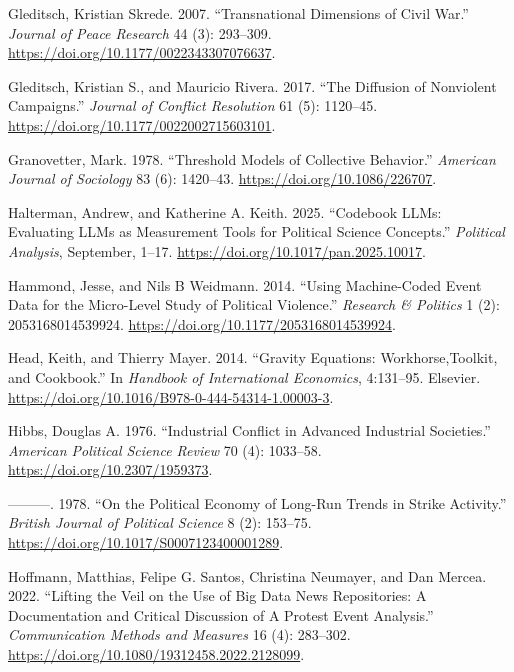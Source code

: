 \documentclass[
  11pt,
]{article}
\newlength{\cslhangindent}
\newenvironment{CSLReferences}[2] %
 {\begin{list}{}{%
  \setlength{\itemindent}{0pt}
  \setlength{\leftmargin}{0pt}
  \setlength{\parsep}{0pt}
  \ifodd #1
   \setlength{\leftmargin}{\cslhangindent}
   \setlength{\itemindent}{-1\cslhangindent}
  \fi
  \setlength{\itemsep}{#2\baselineskip}}}
 {\end{list}}
\begin{document}
\begin{CSLReferences}{1}{0}
Gleditsch, Kristian Skrede. 2007. {``Transnational {Dimensions} of
{Civil War}.''} \emph{Journal of Peace Research} 44 (3): 293--309.
\url{https://doi.org/10.1177/0022343307076637}.

Gleditsch, Kristian S., and Mauricio Rivera. 2017. {``The {Diffusion} of
{Nonviolent Campaigns}.''} \emph{Journal of Conflict Resolution} 61 (5):
1120--45. \url{https://doi.org/10.1177/0022002715603101}.

Granovetter, Mark. 1978. {``Threshold {Models} of {Collective
Behavior}.''} \emph{American Journal of Sociology} 83 (6): 1420--43.
\url{https://doi.org/10.1086/226707}.

Halterman, Andrew, and Katherine A. Keith. 2025. {``Codebook {LLMs}:
{Evaluating LLMs} as {Measurement Tools} for {Political Science
Concepts}.''} \emph{Political Analysis}, September, 1--17.
\url{https://doi.org/10.1017/pan.2025.10017}.

Hammond, Jesse, and Nils B Weidmann. 2014. {``Using Machine-Coded Event
Data for the Micro-Level Study of Political Violence.''} \emph{Research
\& Politics} 1 (2): 2053168014539924.
\url{https://doi.org/10.1177/2053168014539924}.

Head, Keith, and Thierry Mayer. 2014. {``Gravity {Equations}:
{Workhorse},{Toolkit}, and {Cookbook}.''} In \emph{Handbook of
{International Economics}}, 4:131--95. Elsevier.
\url{https://doi.org/10.1016/B978-0-444-54314-1.00003-3}.

Hibbs, Douglas A. 1976. {``Industrial {Conflict} in {Advanced Industrial
Societies}.''} \emph{American Political Science Review} 70 (4):
1033--58. \url{https://doi.org/10.2307/1959373}.

---------. 1978. {``On the {Political Economy} of {Long-Run Trends} in
{Strike Activity}.''} \emph{British Journal of Political Science} 8 (2):
153--75. \url{https://doi.org/10.1017/S0007123400001289}.

Hoffmann, Matthias, Felipe G. Santos, Christina Neumayer, and Dan
Mercea. 2022. {``Lifting the {Veil} on the {Use} of {Big Data News
Repositories}: {A Documentation} and {Critical Discussion} of {A Protest
Event Analysis}.''} \emph{Communication Methods and Measures} 16 (4):
283--302. \url{https://doi.org/10.1080/19312458.2022.2128099}.


\end{CSLReferences}
\end{document}
